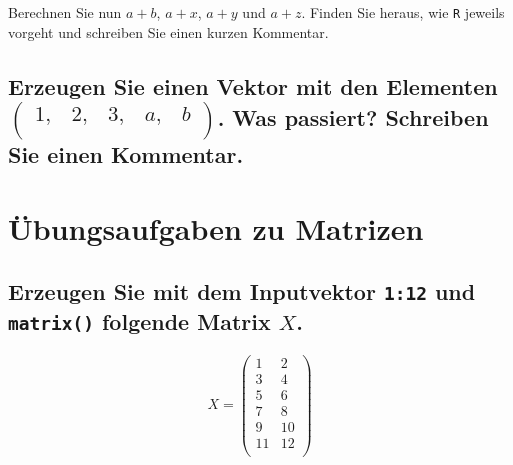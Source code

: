 \documentclass[12pt,a4paper]{article}
\begin{document}
Berechnen Sie nun \(a+b\), \(a+x\), \(a+y\) und \(a+z\). Finden Sie
heraus, wie \texttt{R} jeweils vorgeht und schreiben Sie einen kurzen
Kommentar.

\hypertarget{erzeugen-sie-einen-vektor-mit-den-elementen-beginpmatrix-1-2-3-a-b-endpmatrix.-was-passiert-schreiben-sie-einen-kommentar.}{%
\subsection{\texorpdfstring{Erzeugen Sie einen Vektor mit den Elementen
\(\begin{pmatrix} 1, & 2, & 3, & a, & b \\ \end{pmatrix}\). Was
passiert? Schreiben Sie einen
Kommentar.}{Erzeugen Sie einen Vektor mit den Elementen \textbackslash begin\{pmatrix\} 1, \& 2, \& 3, \& a, \& b \textbackslash\textbackslash{} \textbackslash end\{pmatrix\}. Was passiert? Schreiben Sie einen Kommentar.}}\label{erzeugen-sie-einen-vektor-mit-den-elementen-beginpmatrix-1-2-3-a-b-endpmatrix.-was-passiert-schreiben-sie-einen-kommentar.}}

\vspace{1cm}

\hypertarget{uxfcbungsaufgaben-zu-matrizen}{%
\section{Übungsaufgaben zu
Matrizen}\label{uxfcbungsaufgaben-zu-matrizen}}

\hypertarget{erzeugen-sie-mit-dem-inputvektor-112-und-folgende-matrix-x.}{%
\subsection{\texorpdfstring{Erzeugen Sie mit dem Inputvektor
\texttt{1:12} und \texttt{matrix()} folgende Matrix
\(X\).}{Erzeugen Sie mit dem Inputvektor 1:12 und  folgende Matrix X.}}\label{erzeugen-sie-mit-dem-inputvektor-112-und-folgende-matrix-x.}}

\[X = \begin{pmatrix} 1 & 2 \\ 3 & 4\\ 5 & 6 \\ 7 & 8 \\
9 & 10 \\ 11 & 12 \\\end{pmatrix}\]

\vspace{0.5cm}
\end{document}
